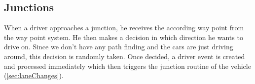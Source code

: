 \subsection{Junctions}
\label{sec:driverJunctions}

When a driver approaches a junction, he receives the according way point
from the way point system. He then makes a decision in which direction he
wants to drive on. Since we don't have any path finding and the cars are
just driving around, this decision is randomly taken. Once decided, a
driver event is created and processed immediately which then triggers
the junction routine of the vehicle (\ref{sec:laneChanges}).

